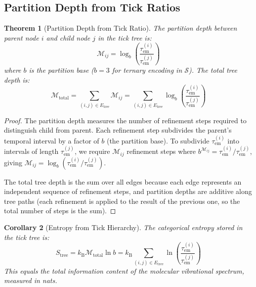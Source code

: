 \documentclass[11pt,twocolumn,a4paper]{article}
\newtheorem{theorem}{Theorem}[section]
\newtheorem{corollary}[theorem]{Corollary}
\theoremstyle{definition}
\theoremstyle{remark}
\newcommand{\kB}{k_{\mathrm{B}}}
\newcommand{\Sspace}{\mathcal{S}}
\newcommand{\Depth}{\mathcal{M}}
\newcommand{\tem}{\tau_{\mathrm{em}}}
\begin{document}
\subsection{Partition Depth from Tick Ratios}

\begin{theorem}[Partition Depth from Tick Ratio]
\label{thm:partition_depth_tick}
The partition depth between parent node $i$ and child node $j$ in the tick tree is:
\begin{equation}
\Depth_{ij} = \log_b\!\left(\frac{\tem^{(i)}}{\tem^{(j)}}\right)
\label{eq:partition_depth_tick}
\end{equation}
where $b$ is the partition base ($b = 3$ for ternary encoding in $\Sspace$). The total tree depth is:
\begin{equation}
\Depth_{\mathrm{total}} = \sum_{(i,j) \in E_{\mathrm{tree}}} \Depth_{ij} = \sum_{(i,j) \in E_{\mathrm{tree}}} \log_b\!\left(\frac{\tem^{(i)}}{\tem^{(j)}}\right)
\label{eq:total_tree_depth}
\end{equation}
\end{theorem}

\begin{proof}
The partition depth measures the number of refinement steps required to distinguish child from parent. Each refinement step subdivides the parent's temporal interval by a factor of $b$ (the partition base). To subdivide $\tem^{(i)}$ into intervals of length $\tem^{(j)}$, we require $\Depth_{ij}$ refinement steps where $b^{\Depth_{ij}} = \tem^{(i)}/\tem^{(j)}$, giving $\Depth_{ij} = \log_b(\tem^{(i)}/\tem^{(j)})$.

The total tree depth is the sum over all edges because each edge represents an independent sequence of refinement steps, and partition depths are additive along tree paths (each refinement is applied to the result of the previous one, so the total number of steps is the sum).
\end{proof}

\begin{corollary}[Entropy from Tick Hierarchy]
\label{cor:entropy_tick}
The categorical entropy stored in the tick tree is:
\begin{equation}
S_{\mathrm{tree}} = \kB \Depth_{\mathrm{total}} \ln b = \kB \sum_{(i,j) \in E_{\mathrm{tree}}} \ln\!\left(\frac{\tem^{(i)}}{\tem^{(j)}}\right)
\label{eq:tree_entropy}
\end{equation}
This equals the total information content of the molecular vibrational spectrum, measured in nats.
\end{corollary}
\end{document}
